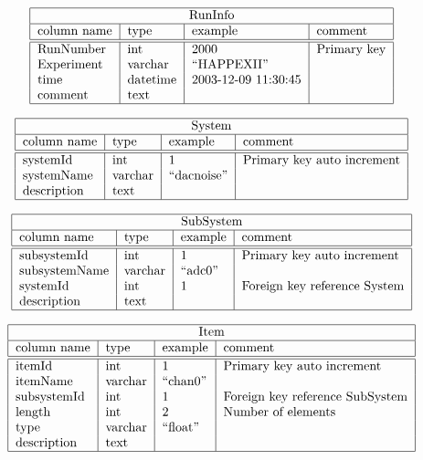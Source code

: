\documentclass[12pt]{article}
\begin{document}
\begin{table}
$$
\begin{tabular}{|l|l|l|l|} \hline
\multicolumn{4}{|c|}{RunInfo} \\
\hline
column name & type & example & comment \\
\hline\hline
RunNumber   & int        & 2000        & Primary key \\
Experiment  &  varchar   &  ``HAPPEXII'' &  \\
time        & datetime   &  2003-12-09 11:30:45&  \\
comment     & text       &             &  \\
\hline
\end{tabular}
$$


$$
\begin{tabular}{|l|l|l|l|} \hline
\multicolumn{4}{|c|}{System} \\
\hline
column name & type & example & comment \\
\hline\hline
systemId    & int     & 1              & Primary key auto increment\\
systemName  & varchar & ``dacnoise'' &  \\
description & text    &                & \\
\hline
\end{tabular}
$$


$$
\begin{tabular}{|l|l|l|l|} \hline
\multicolumn{4}{|c|}{SubSystem} \\
\hline
column name & type & example & comment \\
\hline\hline
subsystemId    & int     &  1           & Primary key auto increment\\
subsystemName  & varchar & ``adc0'' & \\
systemId       & int     &  1           & Foreign key reference System\\
description    & text    &              & \\
\hline
\end{tabular}
$$


$$
\begin{tabular}{|l|l|l|l|} \hline
\multicolumn{4}{|c|}{Item} \\
\hline
column name & type & example & comment \\
\hline\hline
itemId      & int     & 1         & Primary key auto increment\\
itemName    & varchar & ``chan0''   & \\
subsystemId & int     & 1         & Foreign key reference SubSystem\\
length      & int     & 2         & Number of elements\\
type        & varchar & ``float'' & \\
description & text    &           & \\
\hline
\end{tabular}
$$
\caption{Informational tables.}\label{infotables}
\end{table}
\end{document}
